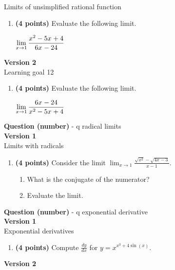 \documentclass[12pt]{amsart}
\begin{document}
Limits of unsimplified rational function
\begin{enumerate}[resume]
\item {\bf (4 points)} 
 Evaluate the following limit. 

$\displaystyle \lim_{x\rightarrow \a} \frac{\fancyp}{\simplep}$

\vfill 
 \end{enumerate}$ $ \\ {\bf Version 2} \\ 
Learning goal 12
\begin{enumerate}[resume]
\item {\bf (4 points)} 
 Evaluate the following limit. 

$\displaystyle \lim_{x\rightarrow \a} \frac{\simplep}{\fancyp}$

\vfill 
 \end{enumerate}\newpage\newpage\def \a{1}\def \b{3}\def \ab{3}\def \c{0}\def \amb{-2}\def \ansroot{1}\def \firstroot{x^{2}}\def \secondroot{4x^{}-3}\def \porm{-1}{\Large{\bf Question (number)}} - q radical limits\\ $ $ \\ {\bf Version 1} \\ 
Limits with radicals
\begin{enumerate}[resume]
\item {\bf (4 points)} 
 Consider the limit $\displaystyle \lim_{x \rightarrow \a} \frac{\sqrt{\firstroot} - \sqrt{\secondroot}}{x-\a}$. \begin{enumerate}
\item What is the conjugate of the numerator? \vspace{3cm}
\item Evaluate the limit.
\end{enumerate}

\vfill 
 \end{enumerate}\newpage\def \varexp{3}\def \newexp{2}\def \trigcoeff{4}\def \trigval{+4}\def \oppval{-4}{\Large{\bf Question (number)}} - q exponential derivative\\ $ $ \\ {\bf Version 1} \\ 
Exponential derivatives
\begin{enumerate}[resume]
\item {\bf (4 points)} 
 Compute $\frac{dy}{dx}$ for $y=x^{x^\varexp \trigval \sin(x)}$.

\vfill 
 \end{enumerate}$ $ \\ {\bf Version 2} \\ 
\end{document}
